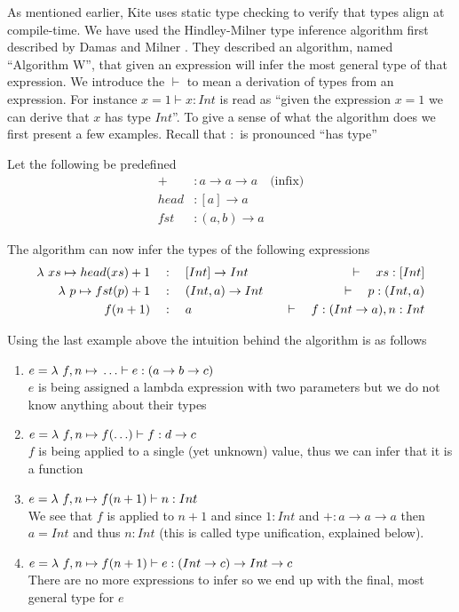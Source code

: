 As mentioned earlier, Kite uses static type checking to verify that types align at compile-time. We have used the Hindley-Milner type inference algorithm first described by Damas and Milner \cite{milner82}. They described an algorithm, named ``Algorithm W'', that given an expression will infer the most general type of that expression. We introduce the $\vdash$ to mean a derivation of types from an expression. For instance $x = 1 \vdash x : Int$ is read as ``given the expression $x = 1$ we can derive that $x$ has type $Int$''. To give a sense of what the algorithm does we first present a few examples. Recall that $:$ is pronounced ``has type''

Let the following be predefined
\begin{align*}
  +      & : a \to a \to a   \quad\text{(infix)}\\
  head   & : [a] \to a   \\
  fst    & : (a, b) \to a
\end{align*}

The algorithm can now infer the types of the following expressions
\begin{align*}
  \lambda{} \ xs \mapsto{} head(xs) + 1 & \quad:\quad [Int] \to Int    & \quad\vdash\quad xs : [Int]             \\
  \lambda{} \ p \mapsto{} fst(p) + 1    & \quad:\quad (Int, a) \to Int & \quad\vdash\quad p : (Int, a)           \\
  f(n + 1)              & \quad:\quad a                & \quad\vdash\quad f: (Int \to a), n: Int \\
\end{align*}

Using the last example above the intuition behind the algorithm is as follows

\begin{enumerate}
\item $e = \lambda{} \ f, n \mapsto{} \ldots \vdash e: (a \to b \to c)$ \\
  $e$ is being assigned a lambda expression with two parameters but we do not know anything about their types
\item $e = \lambda{} \ f, n \mapsto{} f(\ldots) \vdash f: d \to c$ \\
  $f$ is being applied to a single (yet unknown) value, thus we can infer that it is a function
\item $e = \lambda{} \ f, n \mapsto{} f(n + 1) \vdash n : Int$ \\
  We see that $f$ is applied to $n+1$ and since $1: Int$ and $+:a \to a \to a$ then $a = Int$ and thus $n:Int$ (this is called type unification, explained below).
\item $e = \lambda{} \ f, n \mapsto{} f(n + 1) \vdash e : (Int \to c) \to Int \to c$ \\
  There are no more expressions to infer so we end up with the final, most general type for $e$
\end{enumerate}

